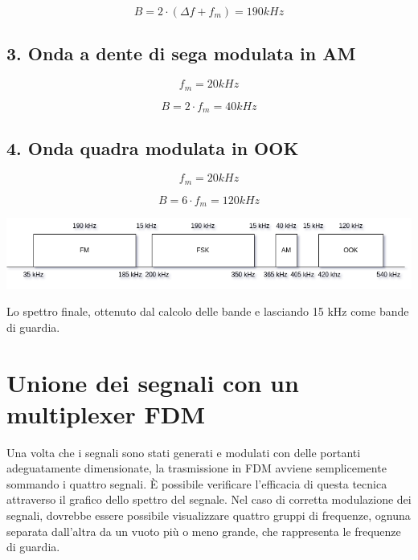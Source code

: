 \documentclass{article}
\begin{document}
\begin{equation}
    B = 2 \cdot (\Delta f + f_m) = 190 kHz
\end{equation}

\subsection{3. Onda a dente di sega modulata in AM}
\begin{equation}
    f_m = 20 kHz
\end{equation}

\begin{equation}
    B = 2 \cdot f_m = 40 kHz
\end{equation}

\subsection{4. Onda quadra modulata in OOK}
\begin{equation}
    f_m = 20 kHz
\end{equation}

\begin{equation}
    B = 6 \cdot f_m = 120 kHz
\end{equation}

\begin{center}
    \includegraphics[width=\textwidth]{bandwidth.png}
\end{center}
Lo spettro finale, ottenuto dal calcolo delle bande e lasciando 15 kHz come bande di guardia.

\section{Unione dei segnali con un multiplexer FDM}
Una volta che i segnali sono stati generati e modulati con delle portanti adeguatamente dimensionate, la trasmissione in FDM
avviene semplicemente sommando i quattro segnali. È possibile verificare l'efficacia di questa tecnica attraverso il grafico
dello spettro del segnale. Nel caso di corretta modulazione dei segnali, dovrebbe essere possibile visualizzare quattro gruppi
di frequenze, ognuna separata dall'altra da un vuoto più o meno grande, che rappresenta le frequenze di guardia.
\end{document}
